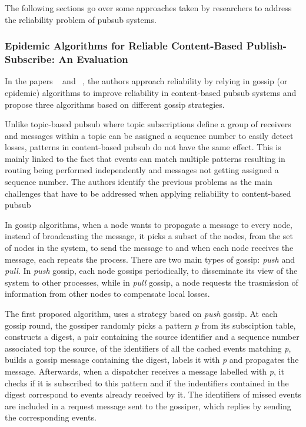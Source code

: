 The following sections go over some approaches taken by researchers to address the reliability problem of \gls{pubsub} systems.

\subsubsection{Epidemic Algorithms for Reliable Content-Based Publish-Subscribe: An Evaluation}
\label{sec:reliable_gossip}

In the papers ~\cite{epidemic-algs-for-pubsub} and ~\cite{intro-epidemic-algs-for-pubsub}, the authors approach reliability by relying in gossip (or epidemic) algorithms to improve reliability in content-based \gls{pubsub} systems and propose three algorithms based on different gossip strategies.

Unlike topic-based \gls{pubsub} where topic subscriptions define a group of receivers and messages within a topic can be assigned a sequence number to easily detect losses, patterns in content-based \gls{pubsub} do not have the same effect. This is mainly linked to the fact that events can match multiple patterns resulting in routing being performed independently and messages not getting assigned a sequence number. The authors identify the previous problems as the main challenges that have to be addressed when applying reliability to content-based \gls{pubsub}

In gossip algorithms, when a node wants to propagate a message to every node, instead of broadcasting the message, it picks a subset of the nodes, from the set of nodes in the system, to send the message to and when each node receives the message, each repeats the process. There are two main types of gossip: \textit{push} and \textit{pull}. In \textit{push} gossip, each node gossips periodically, to disseminate its view of the system to other processes, while in \textit{pull} gossip, a node requests the trasmission of information from other nodes to compensate local losses.

The first proposed algorithm, uses a strategy based on \textit{push} gossip. At each gossip round, the gossiper randomly picks a pattern \textit{p} from its subsciption table, constructs a digest, a pair containing the source identifier and a sequence number associated top the source, of the identifiers of all the cached events matching \textit{p}, builds a gossip message containing the digest, labels it with \textit{p} and propagates the message. Afterwards, when a dispatcher receives a message labelled with \textit{p}, it checks if it is subscribed to this pattern and if the indentifiers contained in the digest correspond to events already received by it. The identifiers of missed events are included in a request message sent to the gossiper, which replies by sending the corresponding events.

